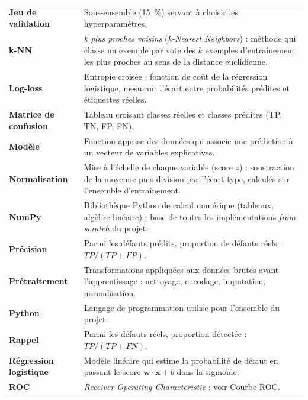 \begin{longtable}{@{}>{\raggedright\bfseries}p{3.2cm}@{\hspace{0.4cm}}>{\raggedright\arraybackslash}p{\dimexpr\textwidth-3.7cm\relax}@{}}
Jeu de validation & Sous-ensemble (15~\%) servant à choisir les
  hyperparamètres. \\

k-NN & \emph{k plus proches voisins} (\emph{k-Nearest Neighbors}) : méthode qui
  classe un exemple par vote des $k$ exemples d'entraînement les plus proches au
  sens de la distance euclidienne. \\

Log-loss & Entropie croisée : fonction de coût de la régression logistique,
  mesurant l'écart entre probabilités prédites et étiquettes réelles. \\

Matrice de confusion & Tableau croisant classes réelles et classes prédites
  (TP, TN, FP, FN). \\

Modèle & Fonction apprise des données qui associe une prédiction à un vecteur de
  variables explicatives. \\

Normalisation & Mise à l'échelle de chaque variable (score $z$) : soustraction
  de la moyenne puis division par l'écart-type, calculés sur l'ensemble
  d'entraînement. \\

NumPy & Bibliothèque Python de calcul numérique (tableaux, algèbre linéaire) ;
  base de toutes les implémentations \emph{from scratch} du projet. \\

Précision & Parmi les défauts prédits, proportion de défauts réels :
  $TP/(TP+FP)$. \\

Prétraitement & Transformations appliquées aux données brutes avant
  l'apprentissage : nettoyage, encodage, imputation, normalisation. \\

Python & Langage de programmation utilisé pour l'ensemble du projet. \\

Rappel & Parmi les défauts réels, proportion détectée : $TP/(TP+FN)$. \\

Régression logistique & Modèle linéaire qui estime la probabilité de défaut en
  passant le score $\mathbf{w}\cdot\mathbf{x}+b$ dans la sigmoïde. \\

ROC & \emph{Receiver Operating Characteristic} : voir Courbe ROC. \\


\end{longtable}
